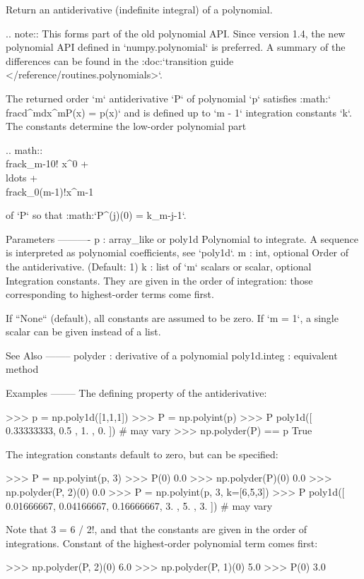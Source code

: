 \begin{DoxyVerb}Return an antiderivative (indefinite integral) of a polynomial.

.. note::
   This forms part of the old polynomial API. Since version 1.4, the
   new polynomial API defined in `numpy.polynomial` is preferred.
   A summary of the differences can be found in the
   :doc:`transition guide </reference/routines.polynomials>`.

The returned order `m` antiderivative `P` of polynomial `p` satisfies
:math:`\\frac{d^m}{dx^m}P(x) = p(x)` and is defined up to `m - 1`
integration constants `k`. The constants determine the low-order
polynomial part

.. math:: \\frac{k_{m-1}}{0!} x^0 + \\ldots + \\frac{k_0}{(m-1)!}x^{m-1}

of `P` so that :math:`P^{(j)}(0) = k_{m-j-1}`.

Parameters
----------
p : array_like or poly1d
    Polynomial to integrate.
    A sequence is interpreted as polynomial coefficients, see `poly1d`.
m : int, optional
    Order of the antiderivative. (Default: 1)
k : list of `m` scalars or scalar, optional
    Integration constants. They are given in the order of integration:
    those corresponding to highest-order terms come first.

    If ``None`` (default), all constants are assumed to be zero.
    If `m = 1`, a single scalar can be given instead of a list.

See Also
--------
polyder : derivative of a polynomial
poly1d.integ : equivalent method

Examples
--------
The defining property of the antiderivative:

>>> p = np.poly1d([1,1,1])
>>> P = np.polyint(p)
>>> P
 poly1d([ 0.33333333,  0.5       ,  1.        ,  0.        ]) # may vary
>>> np.polyder(P) == p
True

The integration constants default to zero, but can be specified:

>>> P = np.polyint(p, 3)
>>> P(0)
0.0
>>> np.polyder(P)(0)
0.0
>>> np.polyder(P, 2)(0)
0.0
>>> P = np.polyint(p, 3, k=[6,5,3])
>>> P
poly1d([ 0.01666667,  0.04166667,  0.16666667,  3. ,  5. ,  3. ]) # may vary

Note that 3 = 6 / 2!, and that the constants are given in the order of
integrations. Constant of the highest-order polynomial term comes first:

>>> np.polyder(P, 2)(0)
6.0
>>> np.polyder(P, 1)(0)
5.0
>>> P(0)
3.0\end{DoxyVerb}
 \mbox{\label{namespacenumpy_1_1lib_1_1polynomial_a665c7ef52e6629867d2f89f2f3d74dde}} 

